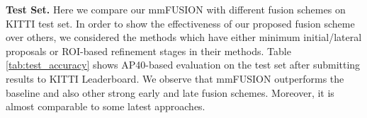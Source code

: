 \documentclass[10pt,twocolumn,letterpaper]{article}
\begin{document}
\textbf{Test Set.}
Here we compare our mmFUSION with different fusion schemes on KITTI test set.  In order to show the effectiveness of our proposed fusion scheme over others, we considered the methods which have either minimum initial/lateral proposals or ROI-based refinement stages in their methods. Table \ref{tab:test_accuracy} shows AP40-based evaluation on the test set after submitting results to KITTI Leaderboard. We observe that mmFUSION outperforms the baseline and also other strong early and late fusion schemes. Moreover, it is almost comparable to some latest approaches. 

\end{document}
